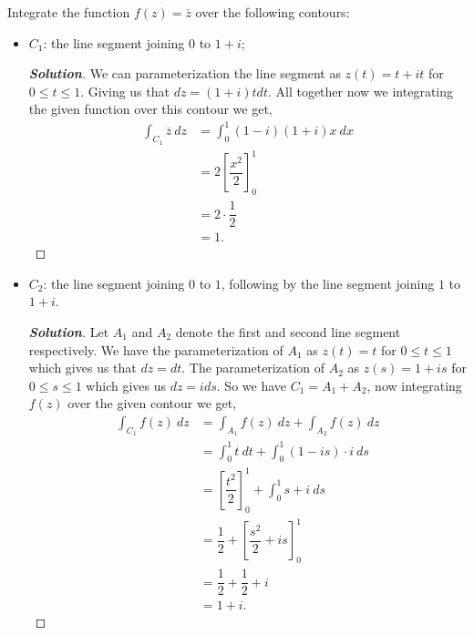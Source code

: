 \documentclass[11pt]{article}
\newenvironment{problem}[2][Problem\!]{\begin{trivlist}
\item[\hskip \labelsep {\bfseries #1}\hskip \labelsep {\bfseries #2}]}{\end{trivlist}}
\newenvironment{solution}{\begin{proof}[\textbf{\textit{Solution}}] }{\end{proof}}
\renewcommand{\leq}{\leqslant}
\newcommand{\lrb}[1]{\left[#1\right]}
\begin{document}
\begin{problem}{6.5}
Integrate the function $f(z) = \overline{z}$ over the following contours:
\begin{itemize}[itemsep=3em]
\item[(a)] $C_1$: the line segment joining $0$ to $1 + i$;
\begin{solution}
    We can parameterization the line segment as $z(t) = t + i t$ for $0 \leq t \leq 1$. Giving us that $dz = (1 + i)t dt$. All together now we integrating the given function over this contour we get,
    \begin{align*}
        \int_{C_1}\overline{z}\ d z &= \int_0^{1}(1 -i)(1 + i)x\ dx \\
        &= 2\lrb{\dfrac{x^{2}}{2}}_0^{1} \\
        &= 2\cdot \dfrac{1}{2} \\
        &= 1.        
    \end{align*}

\end{solution}

\item[(b)] $C_2$: the line segment joining $0$ to $1$, following by the line segment joining $1$ to $1 + i$.
\begin{solution}
    Let $A_1$ and $A_2$ denote the first and second line segment respectively. We have the parameterization of $A_1$ as $z(t) = t$ for $0 \leq t \leq 1$ which gives us that $dz = dt$. The parameterization of $A_2$ as $z(s) = 1 + i s$ for $0 \leq s \leq 1$ which gives us $dz = ids$. So we have $C_1 = A_1 + A_2$, now integrating $f(z)$ over the given contour we get,
    \begin{align*}
        \int_{C_1} f(z)\ dz &= \int_{A_1} f(z)\ dz + \int_{A_2}f(z) \ dz \\
        &= \int_0^{1}t\ dt + \int_0^{1}(1-i s)\cdot  i\ ds  \\
        &= \lrb{\dfrac{t^{2}}{2}}_0^{1} + \int_0^{1}s + i \ ds \\
        &=  \dfrac{1}{2} + \lrb{\dfrac{s^{2}}{2} + i s}_0^{1} \\
        &= \dfrac{1}{2} + \dfrac{1}{2} + i \\
        &= 1 + i.
    \end{align*}  
\end{solution}

\end{itemize}
\end{problem}
\end{document}
